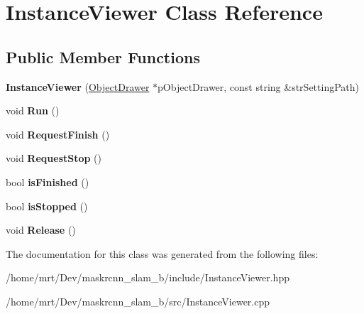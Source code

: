 \hypertarget{classInstanceViewer}{}\section{Instance\+Viewer Class Reference}
\label{classInstanceViewer}
\subsection*{Public Member Functions}
\begin{DoxyCompactItemize}
\item 
\mbox{\label{classInstanceViewer_a2d0ac77d832f497358fd57a5447158db}} 
{\bfseries Instance\+Viewer} (\hyperlink{classObjectDrawer}{Object\+Drawer} $\ast$p\+Object\+Drawer, const string \&str\+Setting\+Path)
\item 
\mbox{\label{classInstanceViewer_a4836e9a510df77ed24f51c8c6e71d8c5}} 
void {\bfseries Run} ()
\item 
\mbox{\label{classInstanceViewer_ab1f8ec95b58b592e76df8a791b6134b3}} 
void {\bfseries Request\+Finish} ()
\item 
\mbox{\label{classInstanceViewer_a009fac7dd071a6d6281563942765c277}} 
void {\bfseries Request\+Stop} ()
\item 
\mbox{\label{classInstanceViewer_a9c20ed61591e273572d16d8d10f503ea}} 
bool {\bfseries is\+Finished} ()
\item 
\mbox{\label{classInstanceViewer_af48069088b3826d02937860f4ae0f594}} 
bool {\bfseries is\+Stopped} ()
\item 
\mbox{\label{classInstanceViewer_ad3b7bf677559e9fa1f0ebaaa4dbda418}} 
void {\bfseries Release} ()
\end{DoxyCompactItemize}


The documentation for this class was generated from the following files\+:\begin{DoxyCompactItemize}
\item 
/home/mrt/\+Dev/maskrcnn\+\_\+slam\+\_\+b/include/Instance\+Viewer.\+hpp\item 
/home/mrt/\+Dev/maskrcnn\+\_\+slam\+\_\+b/src/Instance\+Viewer.\+cpp\end{DoxyCompactItemize}
